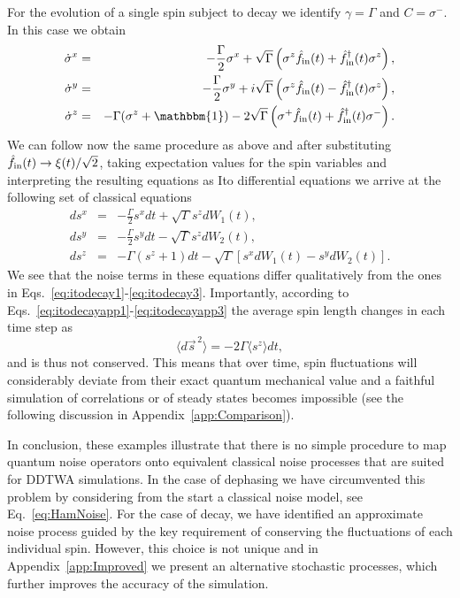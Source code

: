 \documentclass[pra,twocolumn,showpacs,preprintnumbers,amsmath,amssymb,superscriptaddress]{revtex4-1}
\newcommand{\erw}[1]{\langle#1\rangle}
\begin{document}
For the evolution of a single spin subject to decay we identify  $\gamma=\Gamma$ and $C=\sigma^-$. In this case we obtain 
\begin{eqnarray}
\dot \sigma^x &=& - \frac{\Gamma}{2} \sigma^x +\sqrt{\Gamma}\left( \sigma^z \hat f_{\rm in}(t) + \hat f_{\rm in}^\dag(t) \sigma^z\right),  \\
\dot \sigma^y &=&  - \frac{\Gamma}{2} \sigma^y  +i \sqrt{\Gamma}\left( \sigma^z \hat f_{\rm in}(t) - \hat f_{\rm in}^\dag(t) \sigma^z\right),\\
\dot \sigma^z&=&-\Gamma(\sigma^z+\mathbbm{1}) - 2\sqrt{\Gamma}\left( \sigma^+\hat f_{\rm in}(t) + \hat f_{\rm in}^\dag(t) \sigma^-\right).
\end{eqnarray}
We can follow now the same procedure as above and after substituting $\hat f_{\rm in}(t)\rightarrow \xi(t)/\sqrt{2}$, taking expectation values for the spin variables and interpreting the resulting equations as Ito differential equations we arrive at the following set of classical equations 
\begin{eqnarray}
\label{eq:itodecayapp1}
d s^x &=& - \frac{\Gamma}{2} s^x dt  +\sqrt{\Gamma} s^z dW_1(t), \\
d s^y &=&  - \frac{\Gamma}{2} s^y dt - \sqrt{\Gamma} s^z dW_2(t), \\
d s^z&=&-\Gamma(s^z+1) dt - \sqrt{\Gamma} \left[s^x dW_1(t) - s^y dW_2(t)\right].
\label{eq:itodecayapp3}
\end{eqnarray}
We see that the noise terms in these equations differ qualitatively from the ones in Eqs.~\eqref{eq:itodecay1}-\eqref{eq:itodecay3}. Importantly, according to Eqs.~\eqref{eq:itodecayapp1}-\eqref{eq:itodecayapp3} the average spin length changes in each time step as 
\begin{equation}
 \langle d \vec s^{\,2} \rangle = - 2\Gamma \erw{s^z} dt,
\end{equation}
and is thus not conserved. This means that over time, spin fluctuations will considerably deviate from their exact quantum mechanical value and a faithful simulation of correlations or of steady states becomes impossible (see the following discussion in Appendix~\ref{app:Comparison}).

In conclusion, these examples illustrate that there is no simple procedure to map quantum noise operators onto equivalent classical noise processes that are suited for DDTWA simulations. 
In the case of dephasing we have  circumvented this problem by considering from the start a classical noise model, see Eq.~\eqref{eq:HamNoise}. For the case of decay, we have identified an approximate noise process guided by the key requirement of conserving the fluctuations of each individual spin. However, this choice is not unique and in Appendix~\ref{app:Improved} we present an alternative stochastic processes, which further improves the accuracy of the simulation.  
\end{document}
